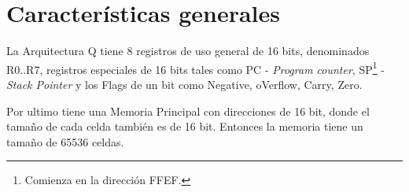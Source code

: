 \label{apendiceQ}

\section{Características generales} 

La Arquitectura Q tiene 8 registros de uso general de 16 bits, denominados R0..R7, registros especiales de 16 bits tales como PC - \textit{Program counter}, SP\footnote{Comienza en la dirección FFEF.} - \textit{Stack Pointer} y los Flags de un bit como Negative, oVerflow, Carry, Zero. 

Por ultimo tiene una Memoria Principal con direcciones de 16 bit, donde el tamaño de cada celda también es de 16 bit. Entonces la memoria tiene un tamaño de 65536 celdas. \\ 
